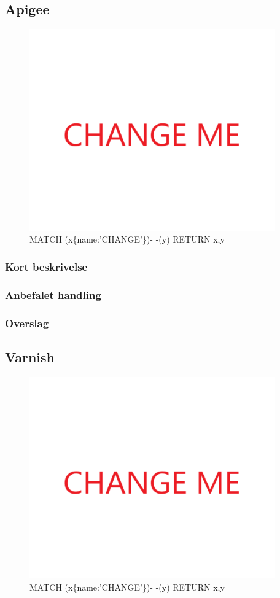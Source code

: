 \documentclass{article}
\begin{document}
\subsection{Apigee}
\begin{figure}[h]
\includegraphics[width=300pt]{CHANGE.PNG}
\caption{MATCH (x\{name:'CHANGE'\})- -(y) RETURN x,y}
\end{figure}
\subsubsection{Kort beskrivelse}
\subsubsection{Anbefalet handling}
\subsubsection{Overslag}
\subsection{Varnish}
\begin{figure}[h]
\includegraphics[width=300pt]{CHANGE.PNG}
\caption{MATCH (x\{name:'CHANGE'\})- -(y) RETURN x,y}
\end{figure}
\end{document}
